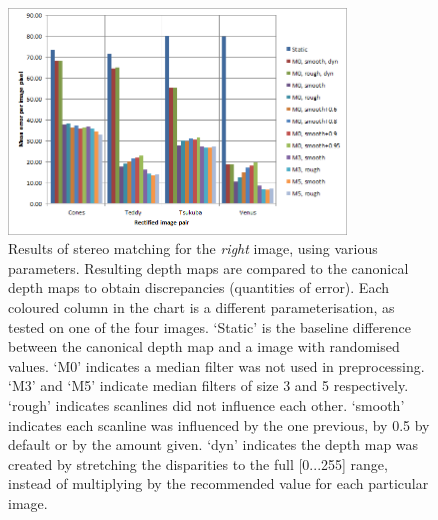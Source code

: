 \begin{figure}[h]
  \centering
  \includegraphics[width=0.8\textwidth]{Stereo-right-report}
  \caption[Results of stereo matching (left image)]{Results of stereo matching
    for the \emph{right} image, using various parameters. Resulting depth maps
    are compared to the canonical depth maps to obtain discrepancies (quantities
    of error). Each coloured column in the chart is a different
    parameterisation, as tested on one of the four images. `Static' is the
    baseline difference between the canonical depth map and a image with
    randomised values. `M0' indicates a median filter was not used in
    preprocessing. `M3' and `M5' indicate median filters of size 3 and 5
    respectively. `rough' indicates scanlines did not influence each other.
    `smooth' indicates each scanline was influenced by the one previous, by 0.5
    by default or by the amount given. `dyn' indicates the depth map was created
    by stretching the disparities to the full [0...255] range, instead of
    multiplying by the recommended value for each particular image.}
  \label{fig:stereo-right}
\end{figure}

